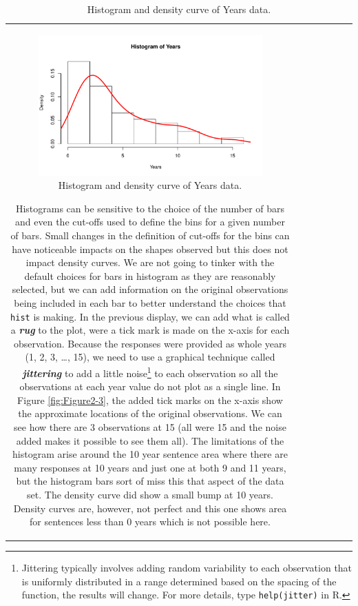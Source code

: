 \documentclass[]{book}
\let\rmarkdownfootnote\footnote%
\def\footnote{\protect\rmarkdownfootnote}
\theoremstyle{definition}
\theoremstyle{definition}
\theoremstyle{remark}
\begin{document}
\begin{longtable}[]{@{}ccccccc@{}}
\begin{minipage}[b]{0.10\columnwidth}
\begin{figure}
\centering
\includegraphics{02-reintroductionToStatistics_files/figure-latex/Figure2-2-1.pdf}
\caption{\label{fig:Figure2-2}Histogram and density curve of Years data.}
\end{figure}

Histograms can be sensitive to the choice of the number of bars and even
the cut-offs used to define the bins for a given number of bars. Small
changes in the definition of cut-offs for the bins can have noticeable
impacts on the shapes observed but this does not impact density curves.
We are not going to tinker with the default choices for bars in
histogram as they are reasonably selected, but we can add information on
the original observations being included in each bar to better
understand the choices that \texttt{hist} is making. In the previous
display, we can add what is called a \textbf{\emph{rug}} to the plot,
were a tick mark is made on the x-axis for each observation. Because the
responses were provided as whole years (1, 2, 3, \ldots{}, 15), we need
to use a graphical technique called \textbf{\emph{jittering}} to add a
little noise\footnote{Jittering typically involves adding random
  variability to each observation that is uniformly distributed in a
  range determined based on the spacing of the function, the results
  will change. For more details, type \texttt{help(jitter)} in R.} to
each observation so all the observations at each year value do not plot
as a single line. In Figure \ref{fig:Figure2-3}, the added tick marks on
the x-axis show the approximate locations of the original observations.
We can see how there are 3 observations at 15 (all were 15 and the noise
added makes it possible to see them all). The limitations of the
histogram arise around the 10 year sentence area where there are many
responses at 10 years and just one at both 9 and 11 years, but the
histogram bars sort of miss this that aspect of the data set. The
density curve did show a small bump at 10 years. Density curves are,
however, not perfect and this one shows area for sentences less than 0
years which is not possible here.





\end{minipage}
\end{longtable}
\end{document}
